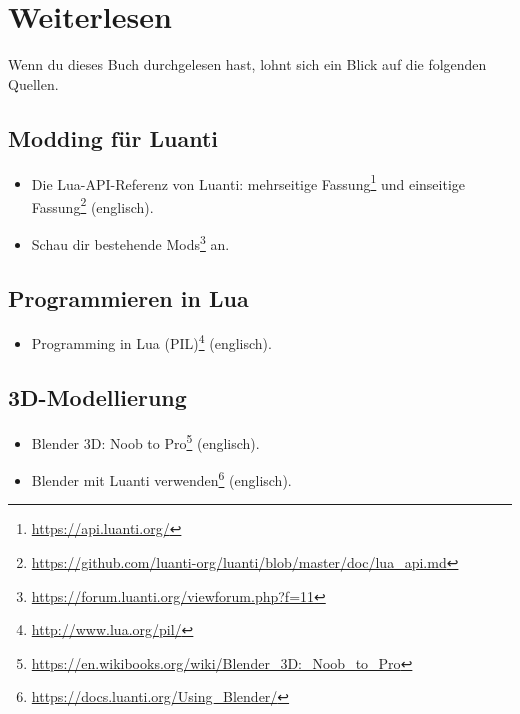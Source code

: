\chapter{Weiterlesen}
\label{ch:quality/readmore}

Wenn du dieses Buch durchgelesen hast, lohnt sich ein Blick auf die
folgenden Quellen.

\section{Modding für Luanti}\label{modding-fuxfcr-luanti}

\begin{itemize}
\tightlist
\item
  Die Lua-API-Referenz von Luanti: mehrseitige Fassung\footnote{\url{https://api.luanti.org/}}
  und einseitige Fassung\footnote{\url{https://github.com/luanti-org/luanti/blob/master/doc/lua_api.md}}
  (englisch).
\item
  Schau dir bestehende Mods\footnote{\url{https://forum.luanti.org/viewforum.php?f=11}}
  an.
\end{itemize}

\section{Programmieren in Lua}\label{programmieren-in-lua}

\begin{itemize}
\tightlist
\item
  Programming in Lua (PIL)\footnote{\url{http://www.lua.org/pil/}}
  (englisch).
\end{itemize}

\section{3D-Modellierung}\label{d-modellierung}

\begin{itemize}
\tightlist
\item
  Blender 3D: Noob to Pro\footnote{\url{https://en.wikibooks.org/wiki/Blender_3D:_Noob_to_Pro}}
  (englisch).
\item
  Blender mit Luanti verwenden\footnote{\url{https://docs.luanti.org/Using_Blender/}}
  (englisch).
\end{itemize}
